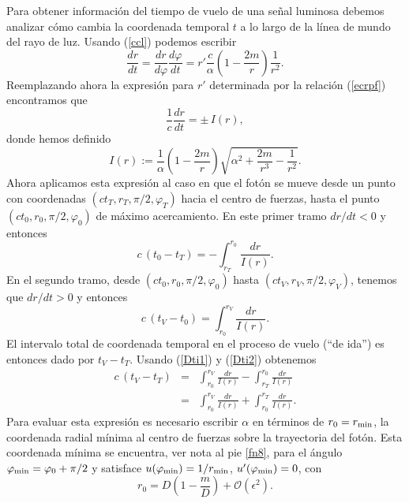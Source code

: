 Para obtener información del tiempo de vuelo de una señal luminosa debemos analizar cómo cambia la coordenada temporal $t$ a lo largo de la línea de mundo del rayo de luz.
Usando (\ref{ccl}) podemos escribir
\begin{equation}
\frac{dr}{dt}=\frac{dr}{d\varphi}\frac{d\varphi}{dt}=r'\frac{c}{\alpha}\left(1-\frac{2m}{r}\right)\frac{1}{r^2}.
\end{equation}
Reemplazando ahora la expresión para $r'$ determinada por la relación (\ref{ecrpf}) encontramos que
\begin{equation}
\frac{1}{c}\frac{dr}{dt}=\pm\, I(r),
\end{equation}
donde hemos definido
\begin{equation}
I(r):=\frac{1}{\alpha}\left(1-\frac{2m}{r}\right)\sqrt{\alpha^2+\frac{2m}{r^3}-\frac{1}{r^2}}.
\end{equation}
Ahora aplicamos esta expresión al caso en que el fotón se mueve desde un punto con coordenadas $(ct_T,r_T,\pi/2,\varphi_T)$ hacia el centro de fuerzas, hasta el punto $(ct_0,r_0,\pi/2,\varphi_0)$ de máximo acercamiento. En este primer tramo $dr/dt<0$ y entonces
\begin{equation}\label{Dti1}
c\,(t_0-t_T)=-\int^{r_0}_{r_T}\frac{dr}{I(r)}.
\end{equation}
En el segundo tramo, desde $(ct_0,r_0,\pi/2,\varphi_0)$ hasta $(ct_V,r_V,\pi/2,\varphi_V)$, tenemos que $dr/dt>0$ y entonces
\begin{equation}\label{Dti2}
c\,(t_V-t_0)=\int_{r_0}^{r_V}\frac{dr}{I(r)}.
\end{equation}
El intervalo total de coordenada temporal en el proceso de vuelo (``de ida'') es entonces dado por $t_V-t_T$. Usando (\ref{Dti1}) y (\ref{Dti2}) obtenemos
\begin{eqnarray}
c\,(t_V-t_T)&=&\int_{r_0}^{r_V}\frac{dr}{I(r)}-\int^{r_0}_{r_T}\frac{dr}{I(r)} \\
&=&\int_{r_0}^{r_V}\frac{dr}{I(r)}+\int_{r_0}^{r_T}\frac{dr}{I(r)}. \label{cDtI}
\end{eqnarray}
Para evaluar esta expresión es necesario escribir $\alpha$ en términos de $r_0=r_{\rm min}$, la coordenada radial mínima al centro de fuerzas sobre la trayectoria del fotón. Esta coordenada mínima se encuentra, ver nota al pie \ref{fn8}, para el ángulo $\varphi_{\rm min}=\varphi_0+\pi/2$ y satisface $u(\varphi_{\rm min})=1/r_{\rm min}$, $u'(\varphi_{\rm min})=0$, con
\begin{equation}
 r_0=D\left(1-\frac{m}{D}\right)+\mathcal{O}(\epsilon^2).
\end{equation}
